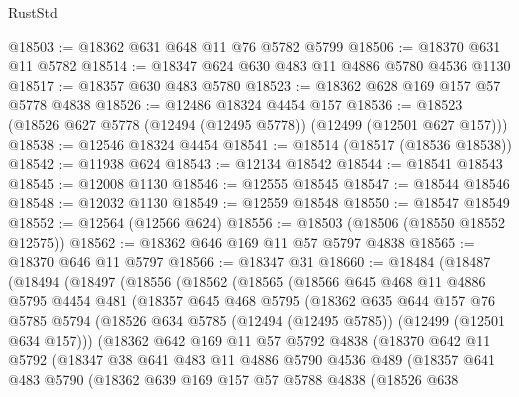 \begin{lexlean}{RustStd}
\begin{coremodule}
{\begin{coremodule}
{{{{{{{{{{{{{{{{{{{{{{{{{{{{{{{{{{{{{{{{{{{{{{{{{{{{{{{{{{{{{{{{{{{{{{{{{{{{{{{{@18503 := @18362 @631 @648 @11 @76 @5782 @5799
@18506 := @18370 @631 @11 @5782
@18514 := @18347 @624 @630 @483 @11 @4886 @5780 @4536 @1130
@18517 := @18357 @630 @483 @5780
@18523 := @18362 @628 @169 @157 @57 @5778 @4838
@18526 := @12486 @18324 @4454 @157
@18536 := @18523 (@18526 @627 @5778 (@12494 (@12495 @5778)) (@12499 (@12501 @627 @157)))
@18538 := @12546 @18324 @4454
@18541 := @18514 (@18517 (@18536 @18538))
@18542 := @11938 @624
@18543 := @12134 @18542
@18544 := @18541 @18543
@18545 := @12008 @1130
@18546 := @12555 @18545
@18547 := @18544 @18546
@18548 := @12032 @1130
@18549 := @12559 @18548
@18550 := @18547 @18549
@18552 := @12564 (@12566 @624)
@18556 := @18503 (@18506 (@18550 @18552 @12575))
@18562 := @18362 @646 @169 @11 @57 @5797 @4838
@18565 := @18370 @646 @11 @5797
@18566 := @18347 @31
@18660 := @18484
    (@18487
      (@18494
        (@18497
          (@18556
            (@18562
              (@18565
                (@18566
                  @645
                  @468
                  @11
                  @4886
                  @5795
                  @4454
                  @481
                  (@18357
                    @645
                    @468
                    @5795
                    (@18362
                      @635
                      @644
                      @157
                      @76
                      @5785
                      @5794
                      (@18526 @634 @5785 (@12494 (@12495 @5785)) (@12499 (@12501 @634 @157)))
                      (@18362
                        @642
                        @169
                        @11
                        @57
                        @5792
                        @4838
                        (@18370
                          @642
                          @11
                          @5792
                          (@18347
                            @38
                            @641
                            @483
                            @11
                            @4886
                            @5790
                            @4536
                            @489
                            (@18357
                              @641
                              @483
                              @5790
                              (@18362
                                @639
                                @169
                                @157
                                @57
                                @5788
                                @4838
                                (@18526
                                  @638
}}}}}}}}}}}}}}}}}}}}}}}}}}}}}}}}}}}}}}}}}}}}}}}}}}}}}}}}}}}}}}}}}}}}}}}}}}}}}}}}
\end{coremodule}}
\end{coremodule}
\end{lexlean}
